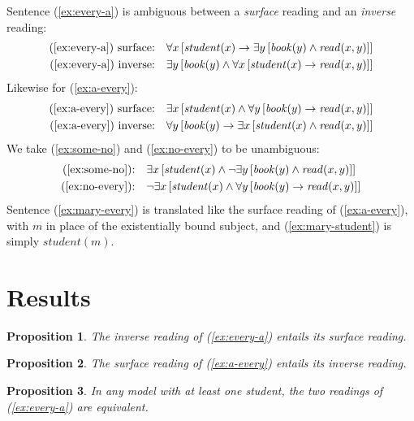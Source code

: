 \documentclass{article}
\newtheorem{proposition}{Proposition}
\begin{document}
Sentence (\ref{ex:every-a}) is ambiguous between a \emph{surface} reading and
an \emph{inverse} reading:
\begin{align*}
  \text{(\ref{ex:every-a}) surface:}\quad & \forall x\,[\mathit{student}(x) \rightarrow \exists y\,[\mathit{book}(y) \wedge \mathit{read}(x,y)]]\\
  \text{(\ref{ex:every-a}) inverse:}\quad & \exists y\,[\mathit{book}(y) \wedge \forall x\,[\mathit{student}(x) \rightarrow \mathit{read}(x,y)]]
\end{align*}
Likewise for (\ref{ex:a-every}):
\begin{align*}
  \text{(\ref{ex:a-every}) surface:}\quad & \exists x\,[\mathit{student}(x) \wedge \forall y\,[\mathit{book}(y) \rightarrow \mathit{read}(x,y)]]\\
  \text{(\ref{ex:a-every}) inverse:}\quad & \forall y\,[\mathit{book}(y) \rightarrow \exists x\,[\mathit{student}(x) \wedge \mathit{read}(x,y)]]
\end{align*}
We take (\ref{ex:some-no}) and (\ref{ex:no-every}) to be unambiguous:
\begin{align*}
  \text{(\ref{ex:some-no}):}\quad & \exists x\,[\mathit{student}(x) \wedge \neg\exists y\,[\mathit{book}(y) \wedge \mathit{read}(x,y)]]\\
  \text{(\ref{ex:no-every}):}\quad & \neg\exists x\,[\mathit{student}(x) \wedge \forall y\,[\mathit{book}(y) \rightarrow \mathit{read}(x,y)]]
\end{align*}
Sentence (\ref{ex:mary-every}) is translated like the surface reading of
(\ref{ex:a-every}), with $m$ in place of the existentially bound subject, and
(\ref{ex:mary-student}) is simply $\mathit{student}(m)$.

\section{Results}

\begin{proposition}\label{prop:inv-surf-1}
The inverse reading of (\ref{ex:every-a}) entails its surface reading.
\end{proposition}

\begin{proposition}\label{prop:surf-inv-2}
The surface reading of (\ref{ex:a-every}) entails its inverse reading.
\end{proposition}

\begin{proposition}\label{prop:equiv-1}
In any model with at least one student, the two readings of
(\ref{ex:every-a}) are equivalent.
\end{proposition}
\end{document}
